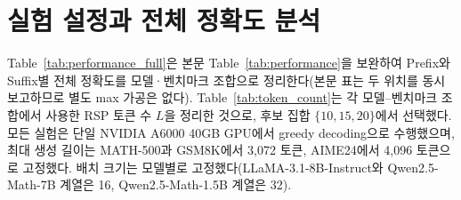 

\clearpage
\section{실험 설정과 전체 정확도 분석}\label{app:setup}\label{app:ablation}

Table~\ref{tab:performance_full}은 본문 Table~\ref{tab:performance}을 보완하여 Prefix와 Suffix별 전체 정확도를 모델·벤치마크 조합으로 정리한다(본문 표는 두 위치를 동시 보고하므로 별도 max 가공은 없다). Table~\ref{tab:token_count}는 각 모델--벤치마크 조합에서 사용한 RSP 토큰 수 $L$을 정리한 것으로, 후보 집합 $\{10, 15, 20\}$에서 선택했다. 모든 실험은 단일 NVIDIA A6000 40GB GPU에서 greedy decoding으로 수행했으며, 최대 생성 길이는 MATH-500과 GSM8K에서 3{,}072 토큰, AIME24에서 4{,}096 토큰으로 고정했다. 배치 크기는 모델별로 고정했다(LLaMA-3.1-8B-Instruct와 Qwen2.5-Math-7B 계열은 16, Qwen2.5-Math-1.5B 계열은 32).

